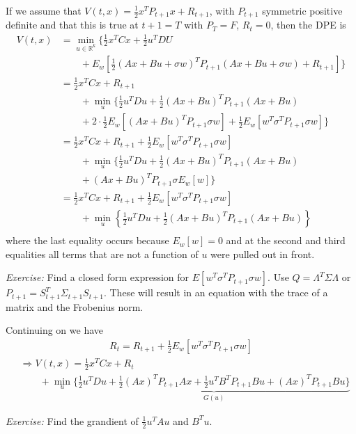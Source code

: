 If we assume that $V(t,x) = \frac{1}{2}x^T P_{t+1}x + R_{t+1}$, with $P_{t+1}$ symmetric positive definite and that this is true at $t+1=T$ with $P_T=F$, $R_t=0$, then the DPE is
\begin{align*}
V(t,x) &= \min_{u\in\mathbb{R}^k}\{\frac{1}{2}x^T Cx + \frac{1}{2}u^T DU \\
&\qquad + E_w[\frac{1}{2}{(Ax+Bu+\sigma w)}^T P_{t+1}(Ax+Bu+\sigma w) + R_{t+1}]\} \\
&= \frac{1}{2}x^T Cx + R_{t+1} \\
&\qquad + \min_u \{\frac{1}{2}u^T Du + \frac{1}{2}{(Ax+Bu)}^T P_{t+1}(Ax+Bu) \\
&\qquad + 2\cdot\frac{1}{2}E_w[{(Ax+Bu)}^T P_{t+1}\sigma w] + \frac{1}{2}E_w[w^T \sigma^T P_{t+1}\sigma w]\} \\
&= \frac{1}{2}x^T Cx + R_{t+1} + \frac{1}{2}E_w[w^T \sigma^T P_{t+1}\sigma w] \\
&\qquad + \min_u \{ \frac{1}{2}u^T Du + \frac{1}{2}{(Ax+Bu)}^T P_{t+1}(Ax+Bu) \\
&\qquad + {(Ax+Bu)}^T P_{t+1}\sigma E_w[w] \} \\
&= \frac{1}{2}x^T Cx + R_{t+1} + \frac{1}{2}E_w[w^T \sigma^T P_{t+1}\sigma w] \\
&\qquad + \min_u \left\lbrace \frac{1}{2}u^T Du + \frac{1}{2}{(Ax+Bu)}^T P_{t+1}(Ax+Bu) \right\rbrace \\
\end{align*}
where the last equality occurs because $E_w[w]=0$ and at the second and third equalities all terms that are not a function of $u$ were pulled out in front.

\textit{Exercise:} Find a closed form expression for $E[w^T \sigma^T P_{t+1}\sigma w]$.
Use $Q=\Lambda^T\Sigma\Lambda$ or $P_{t+1} = S_{t+1}^T\Sigma_{t+1}S_{t+1}$.
These will result in an equation with the trace of a matrix and the Frobenius norm.

Continuing on we have
\begin{align*}
R_t = R_{t+1} + \frac{1}{2}E_w[w^T \sigma^T P_{t+1}\sigma w]
\end{align*}
\begin{align*}
&\Rightarrow V(t,x) = \frac{1}{2}x^T Cx + R_t \\
&\qquad + \min_u\{ \underbrace{\frac{1}{2}u^T Du + \frac{1}{2}{(Ax)}^T P_{t+1}Ax + \frac{1}{2}u^T B^T P_{t+1}Bu + {(Ax)}^T P_{t+1}Bu\}}_{G(u)}
\end{align*}

\textit{Exercise:} Find the grandient of $\frac{1}{2}u^T Au$ and $B^T u$.

